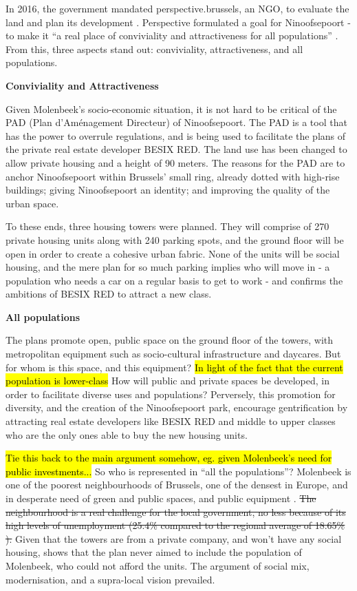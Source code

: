 \documentclass{article}[11pt]
\begin{document}
In 2016, the government mandated perspective.brussels, an NGO, to evaluate the land and plan its development \parencite{diagnosticNinove}. Perspective formulated a goal for Ninoofsepoort - to make it ``a real place of conviviality and attractiveness for all populations'' \parencite{perspectiveNinove}. From this, three aspects stand out: conviviality, attractiveness, and all populations.

\textbf{Conviviality and Attractiveness}

Given Molenbeek's socio-economic situation, it is not hard to be critical of the PAD (Plan d'Aménagement Directeur) of Ninoofsepoort. The PAD is a tool that has the power to overrule regulations, and is being used to facilitate the plans of the private real estate developer BESIX RED. The land use has been changed to allow private housing and a height of 90 meters. The reasons for the PAD are to anchor Ninoofsepoort within Brussels' small ring, already dotted with high-rise buildings; giving Ninoofsepoort an identity; and improving
the quality of the urban space.

To these ends, three housing towers were planned. They will comprise of 270 private housing units along with 240 parking spots, and the ground floor will be open in order to create a cohesive urban fabric. None of the units will be social housing, and the mere plan for so much parking implies who will move in - a population who needs a car on a regular basis to get to work - and confirms the ambitions of BESIX RED to attract a new class. 

\textbf{All populations}

The plans promote open, public space on the ground floor of the towers, with metropolitan equipment such as socio-cultural infrastructure and daycares. But for whom is this space, and this equipment? \hl{In light of the fact that the current population is lower-class} How will public and private spaces be developed, in order to facilitate diverse uses and populations? Perversely, this promotion for diversity, and the creation of the Ninoofsepoort park, encourage gentrification by attracting real estate developers like BESIX RED and middle to upper classes who are the only ones able to buy the new housing units.

\hl{Tie this back to the main argument somehow, eg. given Molenbeek's need for public investments...} So who is represented in ``all the populations''? Molenbeek is one of the poorest neighbourhoods of Brussels, one of the densest in Europe, and in desperate need of green and public spaces, and public equipment \parencite{ieb2019ninove}. \sout{The neighbourhood is a real challenge for the local government, no less because of its high levels of unemployment (25.4\% compared to the regional average of 18.65\% \parencite{monitoring2018chomage}).} Given that the towers are from a private company, and won't have any social housing, shows that the plan never aimed to include the population of Molenbeek, who could not afford the units. The argument of social mix, modernisation, and a supra-local vision prevailed.
\end{document}
